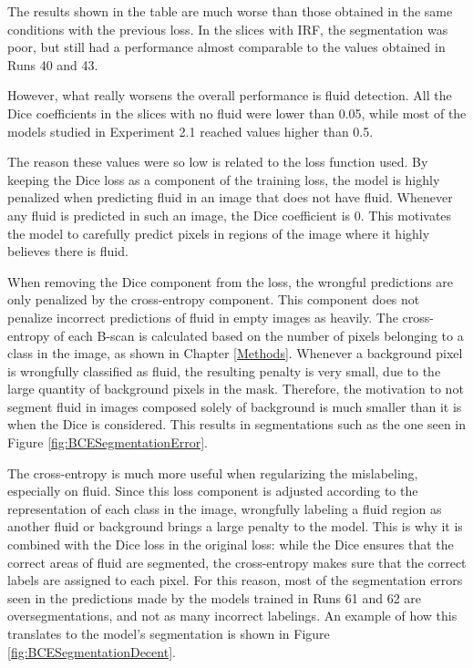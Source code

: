 The results shown in the table are much worse than those obtained in the same conditions with the previous loss. In the slices with IRF, the segmentation was poor, but still had a performance almost comparable to the values obtained in Runs 40 and 43.
\par
However, what really worsens the overall performance is fluid detection. All the Dice coefficients in the slices with no fluid were lower than 0.05, while most of the models studied in Experiment 2.1 reached values higher than 0.5.
\par
The reason these values were so low is related to the loss function used. By keeping the Dice loss as a component of the training loss, the model is highly penalized when predicting fluid in an image that does not have fluid. Whenever any fluid is predicted in such an image, the Dice coefficient is 0. This motivates the model to carefully predict pixels in regions of the image where it highly believes there is fluid.
\par
When removing the Dice component from the loss, the wrongful predictions are only penalized by the cross-entropy component. This component does not penalize incorrect predictions of fluid in empty images as heavily. The cross-entropy of each B-scan is calculated based on the number of pixels belonging to a class in the image, as shown in Chapter \ref{Methods}. Whenever a background pixel is wrongfully classified as fluid, the resulting penalty is very small, due to the large quantity of background pixels in the mask. Therefore, the motivation to not segment fluid in images composed solely of background is much smaller than it is when the Dice is considered. This results in segmentations such as the one seen in Figure \ref{fig:BCESegmentationError}.
\par
The cross-entropy is much more useful when regularizing the mislabeling, especially on fluid. Since this loss component is adjusted according to the representation of each class in the image, wrongfully labeling a fluid region as another fluid or background brings a large penalty to the model. This is why it is combined with the Dice loss in the original loss: while the Dice ensures that the correct areas of fluid are segmented, the cross-entropy makes sure that the correct labels are assigned to each pixel. For this reason, most of the segmentation errors seen in the predictions made by the models trained in Runs 61 and 62 are oversegmentations, and not as many incorrect labelings. An example of how this translates to the model's segmentation is shown in Figure \ref{fig:BCESegmentationDecent}.

